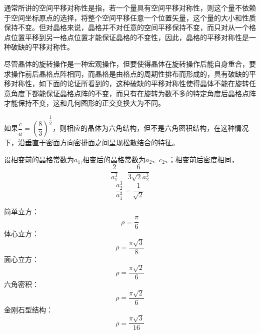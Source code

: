 \documentclass[UTF8,12pt, a4paper, oneside]{ctexart}
\begin{document}
    {通常所讲的空间平移对称性是指，若一个量具有空间平移对称性，则这个量不依赖于空间坐标原点的选择，将整个空间平移任意一个位置矢量，这个量的大小和性质保持不变。但对晶格来说，晶格并不对任意的空间平移保持不变，而只对从一个格点位置平移到另一格点位置才能保证晶格的不变性，因此，晶格的平移对称性是一种破缺的平移对称性。}

    {尽管晶体的旋转操作是一种宏观操作，但要使得晶体在旋转操作后能自身重合，要求操作前后晶格点阵相同，而晶格是由格点的周期性排布而形成的，具有破缺的平移对称性，如下面的论证所看到的，这种破缺的平移对称性使得晶体不能在旋转任意角度下都能保证晶格点阵的不变，而只有在旋转为数不多的特定角度后晶格点阵才能保持不变，这和几何图形的正交变换大为不同。}

    {如果$\dfrac{c}{a}=(\dfrac{8}{3})^{\dfrac{1}{2}}$，则相应的晶体为六角结构，但不是六角密积结构，在这种情况下，沿垂直于密面方向密排面之间呈现松散结合的特征。}
 
    {设相变前的晶格常数为$a_1$,相变后的晶格常数为$a_2、c_2$、；相变前后密度相同，\[ \dfrac{2}{a_1^3}=\dfrac{6}{3\sqrt{2}a_2^3}\]
        \[ \dfrac{a_2^3}{a_1^3}=\dfrac{1}{\sqrt{2}}\]}

    {简单立方：\[\rho=\dfrac{\pi}{6}\]
    体心立方：\[\rho=\dfrac{\pi \sqrt{3}}{8}\]
    面心立方：\[\rho=\dfrac{\pi \sqrt{2} }{6}\]
    六角密积：\[\rho=\dfrac{\pi \sqrt{2} }{6}\]
    金刚石型结构：\[\rho=\dfrac{\pi \sqrt{3} }{16}\]}
\end{document}
